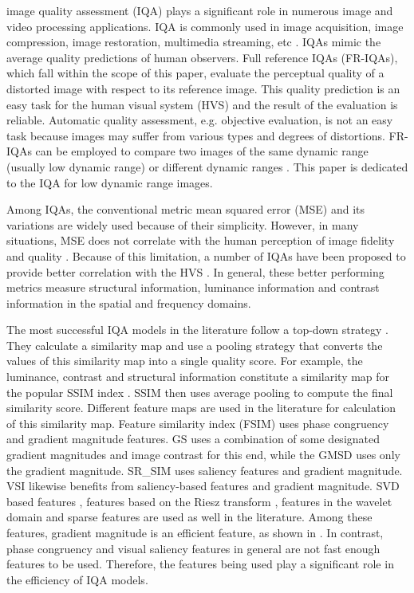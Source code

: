 image quality assessment (IQA) plays a significant
role in numerous image and video processing applications. IQA is commonly used in image acquisition, image compression, image restoration, multimedia streaming, etc \cite{applications2011}. IQAs mimic the average quality predictions of human observers. Full reference IQAs (FR-IQAs), which fall within the scope of this paper, evaluate the perceptual quality of a distorted image with respect to its reference image. This quality prediction is an easy task for the human visual system (HVS) and the result of the evaluation is reliable. Automatic quality assessment, e.g. objective evaluation, is not an easy task because images may suffer from various types
and degrees of distortions. FR-IQAs can be employed to compare two images of the same dynamic range (usually low dynamic range) \cite{SSIM} or different dynamic ranges \cite{TMQI, FSITM}. This paper is dedicated to the IQA for low dynamic range images. 

Among IQAs, the conventional metric mean squared error (MSE) and its variations are widely used because of their simplicity. However, in many situations, MSE does not correlate with the human perception of image fidelity and quality \cite{scope2008, spm2009}. Because of this limitation, a number of IQAs have been proposed to provide better correlation with the HVS \cite{NQM, SSIM, MSSSIM, IFC, VIF, VSNR, RFSIM, MAD, SVR2010, CPSSIM, IWSSIM, FSIM, GS, SRSIM, GMSD, SFF, VSI}. In general, these better performing metrics measure structural information, luminance information and contrast information in the spatial and frequency domains.   

The most successful IQA models in the literature follow a top-down strategy \cite{Metrics2011}. They calculate a similarity map and use a pooling strategy that converts the values of this similarity map into a single quality score. For example, the luminance, contrast and structural information constitute a similarity map for the popular SSIM index \cite{SSIM}. SSIM then uses average pooling to compute the final similarity score. Different feature maps are used in the literature for calculation of this similarity map. Feature similarity index (FSIM) uses phase congruency and gradient magnitude features. GS \cite{GS} uses a combination of some designated gradient magnitudes and image contrast for this end, while the GMSD \cite{GMSD} uses only the gradient magnitude. SR\_SIM \cite{SRSIM} uses saliency features and gradient magnitude. VSI \cite{VSI} likewise benefits from saliency-based features and gradient magnitude. SVD based features \cite{SVD2006}, features based on the Riesz transform \cite{RFSIM}, features in the wavelet domain \cite{VSNR, wavelet2011, CWSSIM} and sparse features \cite{SFF} are used as well in the literature. Among these features, gradient magnitude is an efficient feature, as shown in \cite{GMSD}. In contrast, phase congruency and visual saliency features in general are not fast enough features to be used. Therefore, the features being used play a significant role in the efficiency of IQA models.   

